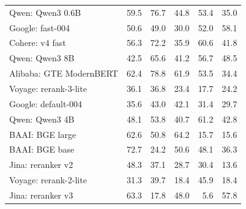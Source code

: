 {\begin{tabular}{lrrrrr}
Qwen: Qwen3 0.6B & 59.5 & 76.7 & 44.8 & 53.4 & 35.0 \\
Google: fast-004 & 50.6 & 49.0 & 30.0 & 52.0 & 58.1 \\
Cohere: v4 fast & 56.3 & 72.2 & 35.9 & 60.6 & 41.8 \\
Qwen: Qwen3 8B & 42.5 & 65.6 & 41.2 & 56.7 & 48.5 \\
Alibaba: GTE ModernBERT & 62.4 & 78.8 & 61.9 & 53.5 & 34.4 \\
Voyage: rerank-3-lite & 36.1 & 36.8 & 23.4 & 17.7 & 24.2 \\
Google: default-004 & 35.6 & 43.0 & 42.1 & 31.4 & 29.7 \\
Qwen: Qwen3 4B & 48.1 & 53.8 & 40.7 & 61.2 & 42.8 \\
BAAI: BGE large & 62.6 & 50.8 & 64.2 & 15.7 & 15.6 \\
BAAI: BGE base & 72.7 & 24.2 & 50.6 & 48.1 & 36.3 \\
Jina: reranker v2 & 48.3 & 37.1 & 28.7 & 30.4 & 13.6 \\
Voyage: rerank-2-lite & 31.3 & 39.7 & 18.4 & 45.9 & 18.4 \\
Jina: reranker v3 & 63.3 & 17.8 & 48.0 & 5.6 & 57.8 \\
\bottomrule
\end{tabular}
}

\bigskip
